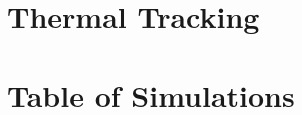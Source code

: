 \documentclass[twocolumn, amsmath, amsfonts, amssymb, trackchanges]{aastex62}
\newcommand{\pro}{\ensuremath{\text{Ro}_{\text{p}}}}
\newcommand{\con}{\ensuremath{\text{Ro}_{\text{c}}}}
\begin{document}
\appendix
\section{Thermal Tracking}
\label{appendix:tracking}

\section{Table of Simulations}
\label{appendix:table}

\end{document}

